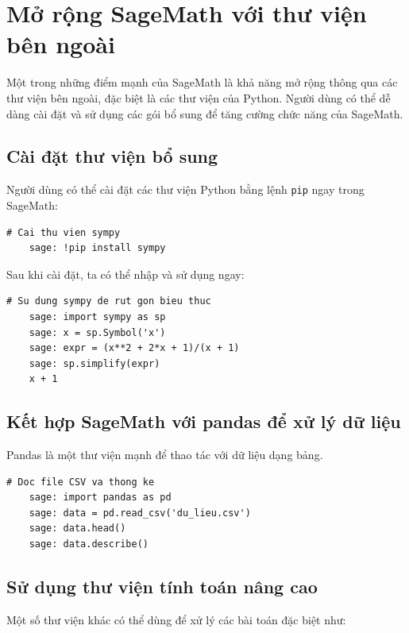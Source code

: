 \section{Mở rộng SageMath với thư viện bên ngoài}

Một trong những điểm mạnh của SageMath là khả năng mở rộng thông qua các thư viện bên ngoài, đặc biệt là các thư viện của Python. Người dùng có thể dễ dàng cài đặt và sử dụng các gói bổ sung để tăng cường chức năng của SageMath.

\subsection{Cài đặt thư viện bổ sung}

Người dùng có thể cài đặt các thư viện Python bằng lệnh \texttt{pip} ngay trong SageMath:

\begin{lstlisting}[basicstyle=\ttfamily\small]
	# Cai thu vien sympy
	sage: !pip install sympy
\end{lstlisting}

Sau khi cài đặt, ta có thể nhập và sử dụng ngay:

\begin{lstlisting}[basicstyle=\ttfamily\small]
	# Su dung sympy de rut gon bieu thuc
	sage: import sympy as sp
	sage: x = sp.Symbol('x')
	sage: expr = (x**2 + 2*x + 1)/(x + 1)
	sage: sp.simplify(expr)
	x + 1
\end{lstlisting}

\subsection{Kết hợp SageMath với pandas để xử lý dữ liệu}

Pandas là một thư viện mạnh để thao tác với dữ liệu dạng bảng.

\begin{lstlisting}[basicstyle=\ttfamily\small]
	# Doc file CSV va thong ke
	sage: import pandas as pd
	sage: data = pd.read_csv('du_lieu.csv')
	sage: data.head()
	sage: data.describe()
\end{lstlisting}

\subsection{Sử dụng thư viện tính toán nâng cao}

Một số thư viện khác có thể dùng để xử lý các bài toán đặc biệt như:

